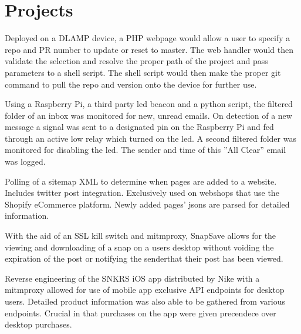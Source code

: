 \documentclass[]{deedy-resume-openfont}
\begin{document}
\begin{minipage}[t]{0.66\textwidth}

\section{Projects}
Deployed on a DLAMP device, a PHP webpage would allow a user to specify a repo and PR number to update or reset to master. The web handler would then validate the selection and resolve the proper path of the project and pass parameters to a shell script. The shell script would then make the proper git command to pull the repo and version onto the device for further use.
\sectionsep

Using a Raspberry Pi, a third party led beacon and a python script, the filtered folder
of an inbox was monitored for new, unread emails. On detection of a new message a
signal was sent to a designated pin on the Raspberry Pi and fed through an active low
relay which turned on the led. A second filtered folder was monitored for disabling
the led. The sender and time of this ”All Clear” email was logged.
\sectionsep

Polling of a sitemap XML to determine when pages are added to a website. Includes twitter
post integration. Exclusively used on webshops
that use the Shopify eCommerce platform. Newly added pages’ jsons are
parsed for detailed information.
\sectionsep

With the aid of an SSL kill switch and mitmproxy, SnapSave allows for the viewing and
downloading of a snap on a users desktop without voiding the expiration of the post
or notifying the senderthat their post has been viewed.
\sectionsep

Reverse engineering of the SNKRS iOS app distributed by Nike with a mitmproxy
allowed for use of mobile app exclusive API endpoints for desktop users. Detailed
product information was also able to be gathered from various endpoints. Crucial in
that purchases on the app were given precendece over desktop purchases.
\sectionsep
\end{minipage} 
\end{document}
